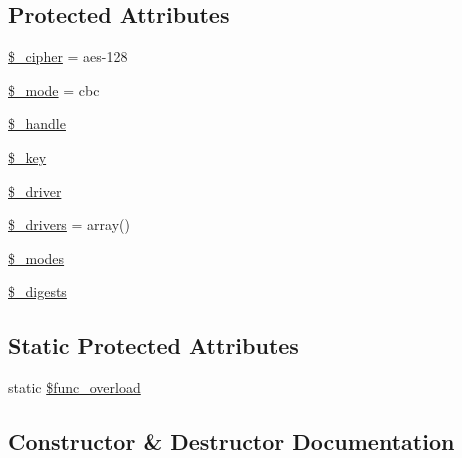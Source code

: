 \subsection*{Protected Attributes}
\begin{DoxyCompactItemize}
\item 
\mbox{\hyperlink{class_c_i___encryption_a4e0ebc185eac8850eed1270574032c20}{\$\+\_\+cipher}} = \textquotesingle{}aes-\/128\textquotesingle{}
\item 
\mbox{\hyperlink{class_c_i___encryption_a591b2fac857402b7049ebb2ca47cdd34}{\$\+\_\+mode}} = \textquotesingle{}cbc\textquotesingle{}
\item 
\mbox{\hyperlink{class_c_i___encryption_a8a6371c0c0a9ffce88717aa263edebc7}{\$\+\_\+handle}}
\item 
\mbox{\hyperlink{class_c_i___encryption_a535630cefaf93746423d63a93daa1099}{\$\+\_\+key}}
\item 
\mbox{\hyperlink{class_c_i___encryption_a538d24348271772aa61f8239cc6431dd}{\$\+\_\+driver}}
\item 
\mbox{\hyperlink{class_c_i___encryption_a3734ce50add95d0d78ea9fff6c4ad856}{\$\+\_\+drivers}} = array()
\item 
\mbox{\hyperlink{class_c_i___encryption_abb65eeb1f25e268d87c4736add738492}{\$\+\_\+modes}}
\item 
\mbox{\hyperlink{class_c_i___encryption_a5f70786f3b0ed3eef6c19f433102ca66}{\$\+\_\+digests}}
\end{DoxyCompactItemize}
\subsection*{Static Protected Attributes}
\begin{DoxyCompactItemize}
\item 
static \mbox{\hyperlink{class_c_i___encryption_aef84be58d58a5895572c5689e56a1047}{\$func\+\_\+overload}}
\end{DoxyCompactItemize}


\subsection{Constructor \& Destructor Documentation}
\mbox{\label{class_c_i___encryption_a85ac5b7f54ad67ec6b5b9dc282717602}} 
